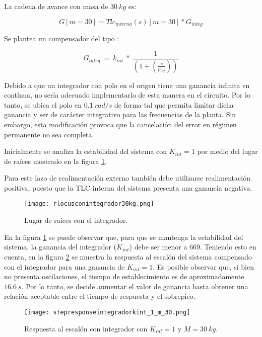 \noindent La cadena de avance con masa de $30\:kg$ es:

\[G[m=30]=Tlc_{interna}(s)[m=30]*G_{integ}\] 

\noindent Se  plantea un compensador del tipo :

\[G_{integ}\ =\ k_{int}\ *\ \frac{1}{(1+(\frac{s}{p_{int}}))}\]

\noindent Debido a que un integrador con polo en el origen tiene una ganancia infinita en contínua, no sería adecuado implementarlo de esta manera en el circuito. Por lo tanto, se ubica el polo en $0.1\:rad/s$ de forma tal que permita limitar dicha ganancia y ser de carácter integrativo para las frecuencias de la planta. Sin embargo, esta modificación provoca que la cancelación del error en régimen permanente no sea completa.


Inicialmente se analiza la estabilidad del sistema con $K_{int} = 1$ por medio del lugar de raíces mostrado en la figura \ref{fig:lugar-de-raices-con-integrador-analog}.

\noindent Para este lazo de realimentación externo también debe utilizarse realimentación positiva, puesto que la TLC interna del sistema presenta una ganancia negativa.


\begin{figure}[H]
	\centering
	\texttt{[image: rlocusconintegrador30kg.png]}
	\caption{Lugar de raíces con el integrador.}
	\label{fig:lugar-de-raices-con-integrador-analog}
\end{figure}

\noindent En la figura \ref{fig:lugar-de-raices-con-integrador-analog} se puede observar que, para que se mantenga la estabilidad del sistema, la ganancia del integrador ($K_{int}$) debe ser menor a 669. Teniendo esto en cuenta, en la figura \ref{fig:respuesta-al-escalon-con-k-1-M-30-analog} se muestra la respuesta al escal\'{o}n del sistema compensado con el integrador para una ganancia de $K_{int}=1$.  Es posible observar que, si bien no presenta oscilaciones, el tiempo de establecimiento es de aproximadamente $16.6 \:s$. Por lo tanto, se decide aumentar el valor de ganancia hasta obtener una relaci\'{o}n aceptable entre el tiempo de respuesta y el sobrepico.

\begin{figure}[H]
	\centering
	\texttt{[image: stepresponseintegradorkint\_1\_m\_30.png]}
	\caption{Respuesta al escalón con integrador con $K_{int} =1$ y $M=30\:kg$.}
	\label{fig:respuesta-al-escalon-con-k-1-M-30-analog}
\end{figure}

